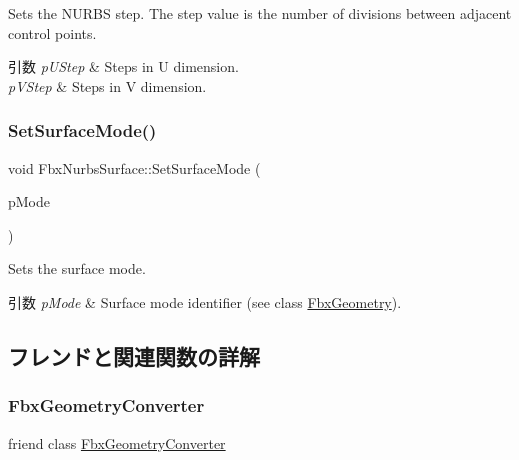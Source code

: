Sets the N\+U\+R\+BS step. The step value is the number of divisions between adjacent control points. 
\begin{DoxyParams}{引数}
{\em p\+U\+Step} & Steps in U dimension. \\
\hline
{\em p\+V\+Step} & Steps in V dimension. \\
\hline
\end{DoxyParams}
\mbox{\label{class_fbx_nurbs_surface_ae11f794bfd8288aa2f4b84b94beaddc1}} 
\subsubsection{\texorpdfstring{Set\+Surface\+Mode()}{SetSurfaceMode()}}
{\footnotesize\ttfamily void Fbx\+Nurbs\+Surface\+::\+Set\+Surface\+Mode (\begin{DoxyParamCaption}\item[{\hyperlink{class_fbx_geometry_adb9d2e34481a2cb40f1d783c665794db}{Fbx\+Geometry\+::\+E\+Surface\+Mode}}]{p\+Mode }\end{DoxyParamCaption})}

Sets the surface mode. 
\begin{DoxyParams}{引数}
{\em p\+Mode} & Surface mode identifier (see class \hyperlink{class_fbx_geometry}{Fbx\+Geometry}). \\
\hline
\end{DoxyParams}


\subsection{フレンドと関連関数の詳解}
\mbox{\label{class_fbx_nurbs_surface_a2c65afd59c2bab21d92824fbe4422545}} 
\subsubsection{\texorpdfstring{Fbx\+Geometry\+Converter}{FbxGeometryConverter}}
{\footnotesize\ttfamily friend class \hyperlink{class_fbx_geometry_converter}{Fbx\+Geometry\+Converter}\hspace{0.3cm}{\ttfamily [friend]}}



